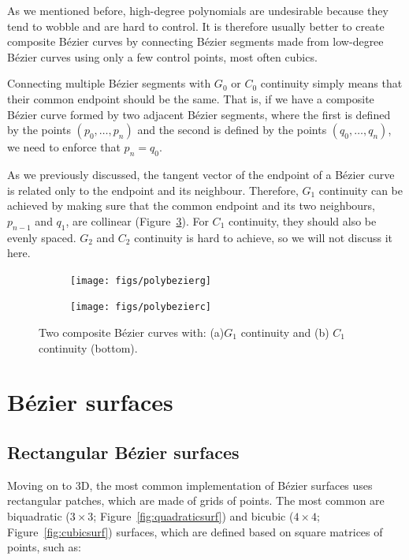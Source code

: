 As we mentioned before, high-degree polynomials are undesirable because they tend to wobble and are hard to control.
It is therefore usually better to create composite B\'ezier curves by connecting B\'ezier segments made from low-degree B\'ezier curves using only a few control points, most often cubics.

Connecting multiple B\'ezier segments with \(G_0\) or \(C_0\) continuity simply means that their common endpoint should be the same.
That is, if we have a composite B\'ezier curve formed by two adjacent B\'ezier segments, where the first is defined by the points \((p_0, \ldots, p_n)\) and the second is defined by the points \((q_0, \ldots, q_n)\), we need to enforce that \(p_n = q_0\).

As we previously discussed, the tangent vector of the endpoint of a B\'ezier curve is related only to the endpoint and its neighbour.
Therefore, \(G_1\) continuity can be achieved by making sure that the common endpoint and its two neighbours, \ie\ \(p_{n-1}\) and \(q_1\), are collinear (Figure~\ref{fig:polybezier}).
For \(C_1\) continuity, they should also be evenly spaced.
\(G_2\) and \(C_2\) continuity is hard to achieve, so we will not discuss it here.

\begin{figure}
\centering
\begin{subfigure}{0.5\linewidth}
\texttt{[image: figs/polybezierg]}
\caption{}%
\label{subfig:polybezierg}
\end{subfigure}%
\begin{subfigure}{0.5\linewidth}
\texttt{[image: figs/polybezierc]}
\caption{}%
\label{subfig:polybezierc}
\end{subfigure}%
\caption{Two composite B\'ezier curves with: (a)\(G_1\) continuity and (b) \(C_1\) continuity (bottom).}%
\label{fig:polybezier}
\end{figure}

\section{B\'ezier surfaces}
\subsection{Rectangular B\'ezier surfaces}

Moving on to 3D, the most common implementation of B\'ezier surfaces uses rectangular patches, which are made of grids of points.
The most common are biquadratic (\(3 \times 3\); Figure~\ref{fig:quadraticsurf}) and bicubic (\(4 \times 4\); Figure~\ref{fig:cubicsurf}) surfaces, which are defined based on square matrices of points, such as:

